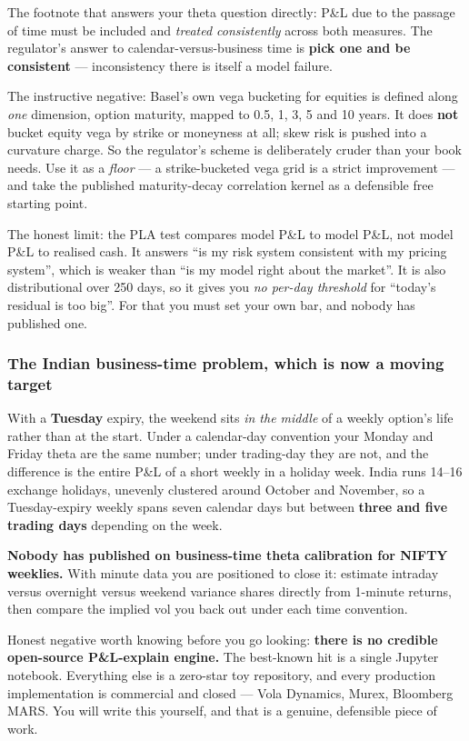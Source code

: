 \documentclass[11pt,a4paper]{article}
\newcommand{\srcnote}[1]{{\footnotesize\color{soft}#1\par}}
\begin{document}
The footnote that answers your theta question directly: P\&L due to the passage of
time must be included and \emph{treated consistently} across both measures. The
regulator's answer to calendar-versus-business time is \textbf{pick one and be
consistent} --- inconsistency there is itself a model failure.

The instructive negative: Basel's own vega bucketing for equities is defined along
\emph{one} dimension, option maturity, mapped to 0.5, 1, 3, 5 and 10 years. It
does \textbf{not} bucket equity vega by strike or moneyness at all; skew risk is
pushed into a curvature charge. So the regulator's scheme is deliberately cruder
than your book needs. Use it as a \emph{floor} --- a strike-bucketed vega grid is
a strict improvement --- and take the published maturity-decay correlation kernel
as a defensible free starting point.

\srcnote{The honest limit: the PLA test compares model P\&L to model P\&L, not
model P\&L to realised cash. It answers ``is my risk system consistent with my
pricing system'', which is weaker than ``is my model right about the market''. It
is also distributional over 250 days, so it gives you \emph{no per-day threshold}
for ``today's residual is too big''. For that you must set your own bar, and
nobody has published one.}

\subsubsection{The Indian business-time problem, which is now a moving target}

With a \textbf{Tuesday} expiry, the weekend sits \emph{in the middle} of a weekly
option's life rather than at the start. Under a calendar-day convention your
Monday and Friday theta are the same number; under trading-day they are not, and
the difference is the entire P\&L of a short weekly in a holiday week. India runs
14--16 exchange holidays, unevenly clustered around October and November, so a
Tuesday-expiry weekly spans seven calendar days but between \textbf{three and five
trading days} depending on the week.

\textbf{Nobody has published on business-time theta calibration for NIFTY
weeklies.} With minute data you are positioned to close it: estimate intraday
versus overnight versus weekend variance shares directly from 1-minute returns,
then compare the implied vol you back out under each time convention.

\srcnote{Honest negative worth knowing before you go looking: \textbf{there is no
credible open-source P\&L-explain engine.} The best-known hit is a single Jupyter
notebook. Everything else is a zero-star toy repository, and every production
implementation is commercial and closed --- Vola Dynamics, Murex, Bloomberg MARS.
You will write this yourself, and that is a genuine, defensible piece of work.}
\end{document}

